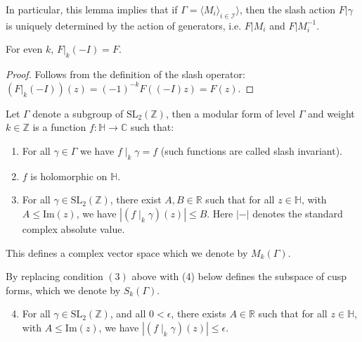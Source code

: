 In particular, this lemma implies that if $\Gamma = \langle M_i \rangle_{i \in \mathcal{I}} \rangle$, then the slash action $F|\gamma$ is uniquely determined by the action of generators, i.e. $F|M_i$ and $F|M_i^{-1}$.

\begin{lemma}\label{lemma:slash-negI-even-weight}\leanok
   For even $k$, $F|_{k}(-I) = F$.
\end{lemma}
\begin{proof}
    \leanok
Follows from the definition of the slash operator:
$(F|_{k}(-I))(z) = (-1)^{-k}F((-I)z) = F(z)$.
\end{proof}

\begin{definition}\label{def:Mk}\leanok
	Let  $\Gamma$ denote a subgroup of $\mathrm{SL}_2(\mathbb{Z})$, then a modular form  of level $\Gamma$ and weight $k \in \mathbb{Z}$ is a function $f : \mathbb{H} \to \mathbb{C}$ such that:
	\begin{enumerate}
		\item For all $\gamma \in \Gamma$ we have $f\mid_k \gamma = f$  (such functions are called slash invariant).
		\item $f$ is holomorphic on $\mathbb{H}$.
		\item For all $\gamma \in \mathrm{SL}_2(\mathbb{Z})$, there exist $A, B \in \mathbb{R}$ such that for all $z \in \mathbb{H}$, with $ A \le \mathrm{Im}(z)$, we have $|(f \mid_k \gamma) (z) |\le B$. Here $| - |$ denotes the standard complex absolute value.
	\end{enumerate}
    This defines a complex vector space which we denote by $M_{k}(\Gamma)$.
\end{definition}
By replacing condition $(3)$ above with (4) below defines the subspace of cusp forms, which we denote by $S_k(\Gamma)$.

\begin{enumerate}
	 \setcounter{enumi}{3}
	\item  For all $\gamma \in \mathrm{SL}_2(\mathbb{Z})$, and all  $0 < \epsilon$, there exists $A \in \mathbb{R}$ such that for all $z \in \mathbb{H}$, with $ A \le \mathrm{Im}(z)$, we have $|(f \mid_k \gamma) (z) |\le \epsilon$.
\end{enumerate}


